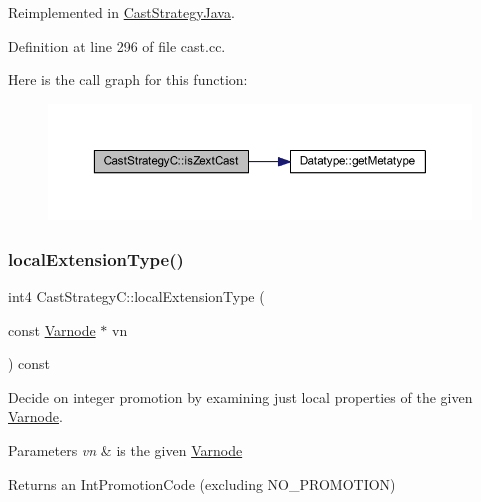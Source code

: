 Reimplemented in \mbox{\hyperlink{class_cast_strategy_java_a6c8536d19ca90746652c78d0781e98b6}{Cast\+Strategy\+Java}}.



Definition at line 296 of file cast.\+cc.

Here is the call graph for this function\+:
\nopagebreak
\begin{figure}[H]
\begin{center}
\leavevmode
\includegraphics[width=350pt]{class_cast_strategy_c_a5c4b61d624a78a2e6f16bf2902e5b8e6_cgraph}
\end{center}
\end{figure}
\mbox{\label{class_cast_strategy_c_ac630d23883fc4d95a12eba08b64e6734}} 
\subsubsection{\texorpdfstring{localExtensionType()}{localExtensionType()}}
{\footnotesize\ttfamily int4 Cast\+Strategy\+C\+::local\+Extension\+Type (\begin{DoxyParamCaption}\item[{const \mbox{\hyperlink{class_varnode}{Varnode}} $\ast$}]{vn }\end{DoxyParamCaption}) const\hspace{0.3cm}{\ttfamily [virtual]}}



Decide on integer promotion by examining just local properties of the given \mbox{\hyperlink{class_varnode}{Varnode}}. 


\begin{DoxyParams}{Parameters}
{\em vn} & is the given \mbox{\hyperlink{class_varnode}{Varnode}} \\
\hline
\end{DoxyParams}
\begin{DoxyReturn}{Returns}
an Int\+Promotion\+Code (excluding N\+O\+\_\+\+P\+R\+O\+M\+O\+T\+I\+ON) 
\end{DoxyReturn}


